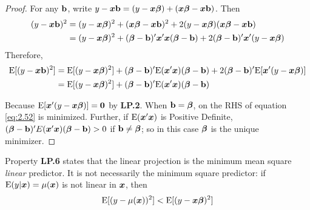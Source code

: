 \documentclass[11pt, oneside, a4paper, article]{article}
\numberwithin{equation}{section}
\begin{document}
\begin{proof}
For any $\mathbf{b}$, write 
$y - \boldsymbol{x}\mathbf{b} = (y - \boldsymbol{x} \boldsymbol{\beta}) + (\boldsymbol{x} \boldsymbol{\beta} - \boldsymbol{x} \mathbf{b})$. Then
\begin{align*}
(y - \boldsymbol{x}\mathbf{b})^{2} &= 
(y - \boldsymbol{x} \boldsymbol{\beta})^{2} +
(\boldsymbol{x} \boldsymbol{\beta} - \boldsymbol{x} \mathbf{b})^{2} +
2 (y - \boldsymbol{x} \boldsymbol{\beta}) (\boldsymbol{x} \boldsymbol{\beta} - \boldsymbol{x} \mathbf{b})
\\ &= 
(y - \boldsymbol{x} \boldsymbol{\beta})^{2} +
(\boldsymbol{\beta} - \mathbf{b})' \boldsymbol{x}' \boldsymbol{x} (\boldsymbol{\beta} - \mathbf{b}) +
2(\boldsymbol{\beta} - \mathbf{b})' \boldsymbol{x}' (y - \boldsymbol{x} \boldsymbol{\beta}) 
\end{align*}
%
Therefore,
%
\begin{align}
\notag
\text{E}[(y - \boldsymbol{x}\mathbf{b})^2] &= 
\text{E}[( y - \boldsymbol{x} \boldsymbol{\beta})^{2}] + (\boldsymbol{\beta} - \mathbf{b})'\text{E}(\boldsymbol{x}'\boldsymbol{x})(\boldsymbol{\beta} - \mathbf{b})
+
2(\boldsymbol{\beta} - \mathbf{b})' \text{E}[ \boldsymbol{x}'(y - \boldsymbol{x} \boldsymbol{\beta})]
\\ 
\label{eq:2.52}
&= 
\text{E}[( y - \boldsymbol{x} \boldsymbol{\beta})^{2}] + (\boldsymbol{\beta} - \mathbf{b})'\text{E}(\boldsymbol{x}'\boldsymbol{x})(\boldsymbol{\beta} - \mathbf{b})
\end{align}

Because $\text{E}[ \boldsymbol{x}'(y - \boldsymbol{x} \boldsymbol{\beta})] = \boldsymbol{0}$ by \textbf{LP.2}.
When $\mathbf{b} = \boldsymbol{\beta}$, on the RHS of equation \eqref{eq:2.52} is minimized.
Further, if $\text{E}(\boldsymbol{x}'\boldsymbol{x})$ is Positive Definite, 
$( \boldsymbol{\beta} - \mathbf{b} )' E( \boldsymbol{x}'\boldsymbol{x} ) ( \boldsymbol{\beta} - \mathbf{b} ) > 0$ if $\mathbf{b} \neq \boldsymbol{\beta}$; so in this case $\boldsymbol{\beta}$ is the unique minimizer.
\end{proof}

\begin{remark}
	Property \textbf{LP.6} states that the linear projection is the minimum mean square \textit{linear} predictor.
	It is not necessarily the minimum square predictor: if $\text{E}(y | \boldsymbol{x}) = \mu(\boldsymbol{x})$ is not linear in $\boldsymbol{x}$, then
	\begin{equation} \label{eq:2.53}
	\text{E}[ ( y - \mu(\boldsymbol{x}) )^2 ] < \text{E}[ ( y - \boldsymbol{x} \boldsymbol{\beta})^2 ]
\end{equation}
\end{remark}


\end{document}
